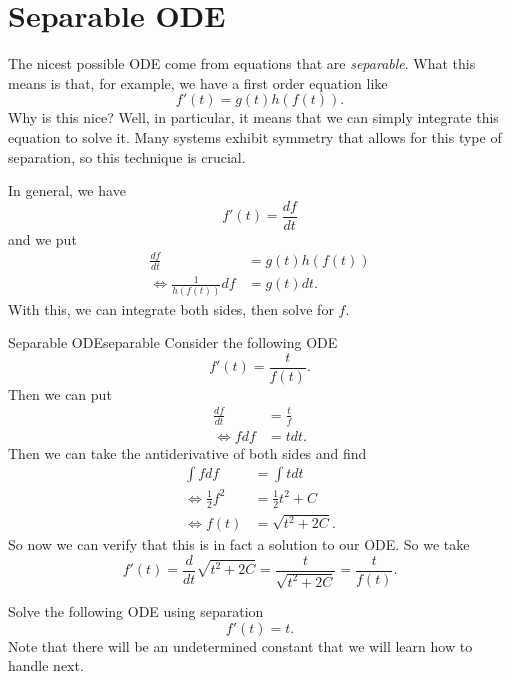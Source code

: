         \section{Separable ODE}
        The nicest possible ODE come from equations that are \emph{separable}.  What this means is that, for example, we have a first order equation like
        \[
        f'(t)=g(t)h(f(t)).
        \]
        Why is this nice? Well, in particular, it means that we can simply integrate this equation to solve it.  Many systems exhibit symmetry that allows for this type of separation, so this technique is crucial.
        
        In general, we have
        \[
        f'(t)=\frac{df}{dt}
        \]
        and we put
        \begin{align*}
            \frac{df}{dt}&=g(t)h(f(t))\\
            \iff \frac{1}{h(f(t))}df &= g(t)dt.
        \end{align*}
        With this, we can integrate both sides, then solve for $f$.  
        
        \begin{ex}{Separable ODE}{separable}
        Consider the following ODE
        \[
        f'(t)=\frac{t}{f(t)}. 
        \]
        Then we can put
        \begin{align*}
            \frac{df}{dt}&= \frac{t}{f}\\
            \iff fdf &= t dt.
        \end{align*}
        Then we can take the antiderivative of both sides and find
        \begin{align*}
            \int fdf &= \int t dt\\
            \iff \frac{1}{2}f^2 &= \frac{1}{2}t^2 + C\\
            \iff f(t)&=\sqrt{t^2+2C}.
        \end{align*}
        So now we can verify that this is in fact a solution to our ODE.  So we take
        \[
        f'(t) = \frac{d}{dt}\sqrt{t^2+2C}= \frac{t}{\sqrt{t^2+2C}} = \frac{t}{f(t)}.
        \]
        \end{ex}
        
        \begin{exercise}
        Solve the following ODE using separation
        \[
        f'(t)=t.
        \]
        Note that there will be an undetermined constant that we will learn how to handle next.
        \end{exercise}
        
